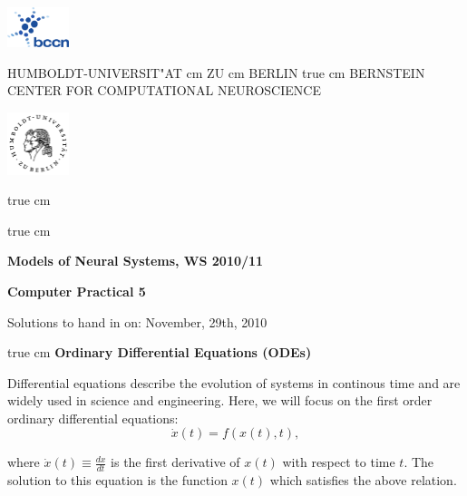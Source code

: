 \documentclass[12pt, a4]{article}
\begin{document}
\parbox{2cm}{
\includegraphics[width=1.8cm]{bccnlogo.pdf}
}
\parbox{11cm}{
\begin{center}
\large HUMBOLDT-UNIVERSIT"AT  cm ZU  cm BERLIN
 true cm
\mgross BERNSTEIN CENTER FOR COMPUTATIONAL NEUROSCIENCE
\end{center}
}
\parbox{2cm}
{
\hfill
\includegraphics[width=1.8cm]{hublogo.pdf}
}

 true cm



 true cm
\centerline{\bf Models of Neural Systems, WS 2010/11}
\centerline{\bf Computer Practical 5}
\centerline{Solutions to hand in on: November, 29th, 2010}

 true cm
{\bf Ordinary Differential Equations (ODEs)}

\medskip
Differential equations describe the evolution of systems in continous
time and are widely used in science and engineering. Here, we will
focus on the first order ordinary differential equations:
\begin{equation}
    \dot{x}(t) = f\left(x(t),t\right),
    \label{eq:ODE}
\end{equation} 

where $\dot{x}(t)\equiv\frac{dx}{dt}$ is the first derivative of
$x(t)$ with respect to time $t$. The solution to this equation
is the function $x(t)$ which satisfies the above relation.
\end{document}
